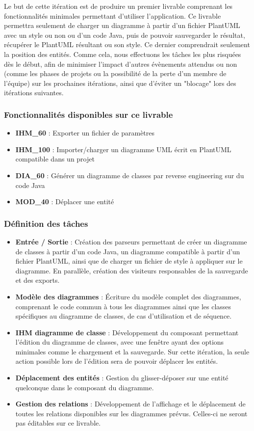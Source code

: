 \documentclass[hidelinks, 10pt,a4paper]{article}
\begin{document}
Le but de cette itération est de produire un premier livrable comprenant les fonctionnalités
minimales permettant d'utiliser l'application. Ce livrable permettra seulement de charger un diagramme
à partir d'un fichier PlantUML avec un style ou non ou d'un code Java, puis de pouvoir sauvegarder
le résultat, récupérer le PlantUML résultant ou son style. Ce dernier comprendrait seulement la position
des entités. Comme cela, nous effectuons les tâches les plus risquées dès le début, afin de minimiser
l'impact d'autres évènements attendus ou non (comme les phases de projets ou la possibilité de la perte
d'un membre de l'équipe) sur les prochaines itérations, ainsi que d'éviter un "blocage" lors des itérations
suivantes.

\subsubsection{Fonctionnalités disponibles sur ce livrable}
\begin{itemize}
\item \textbf{IHM\_60} : Exporter un fichier de paramètres
\item \textbf{IHM\_100} : Importer/charger un diagramme UML écrit en PlantUML compatible dans un projet
\item \textbf{DIA\_60} : Générer un diagramme de classes par reverse engineering sur du code Java
\item \textbf{MOD\_40} : Déplacer une entité
\end{itemize}

\subsubsection{Définition des tâches}
\begin{itemize}
\item \textbf{Entrée / Sortie} : Création des parseurs permettant de créer un diagramme de classes à partir d'un
code Java, un diagramme compatible à partir d'un fichier PlantUML, ainsi que de charger un fichier de style à appliquer sur le diagramme.
En parallèle, création des visiteurs responsables de la sauvegarde et des exports.
\item \textbf{Modèle des diagrammes} : Écriture du modèle complet des diagrammes, comprenant le code commun
à tous les diagrammes ainsi que les classes spécifiques au diagramme de classes, de cas d'utilisation et de
séquence.
\item \textbf{IHM diagramme de classe} : Développement du composant permettant l'édition du diagramme de
classes, avec une fenêtre ayant des options minimales comme le chargement et la sauvegarde.
Sur cette itération, la seule action possible lors de l'édition sera de pouvoir déplacer les entités.
\item \textbf{Déplacement des entités} : Gestion du glisser-déposer sur une entité quelconque dans le
composant du diagramme.
\item \textbf{Gestion des relations} : Développement de l'affichage et le déplacement de toutes
les relations disponibles sur les diagrammes prévus. Celles-ci ne seront pas éditables sur ce livrable.
\end{itemize}
\end{document}
